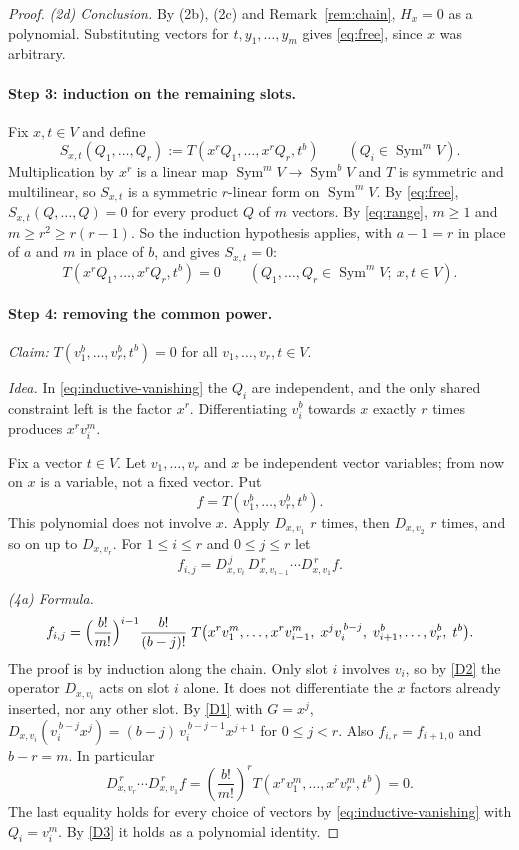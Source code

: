 \documentclass[11pt]{article}
\theoremstyle{remark}
\DeclareMathOperator{\Sym}{Sym}
\newcommand{\D}[2]{D_{#1,#2}}
\begin{document}
\begin{proof}
\emph{(2d) Conclusion.}
By (2b), (2c) and Remark~\ref{rem:chain}, $H_x=0$ as a polynomial.
Substituting vectors for $t,y_1,\ldots,y_m$ gives \eqref{eq:free}, since
$x$ was arbitrary.

\paragraph{Step 3: induction on the remaining slots.}
Fix $x,t\in V$ and define
\[
 S_{x,t}(Q_1,\ldots,Q_r)
 :=T(x^rQ_1,\ldots,x^rQ_r,t^b)
 \qquad(Q_i\in\Sym^mV).
\]
Multiplication by $x^r$ is a linear map $\Sym^mV\to\Sym^bV$ and $T$ is
symmetric and multilinear, so $S_{x,t}$ is a symmetric $r$-linear form on
$\Sym^mV$. By \eqref{eq:free}, $S_{x,t}(Q,\ldots,Q)=0$ for every product
$Q$ of $m$ vectors. By \eqref{eq:range}, $m\ge1$ and
$m\ge r^2\ge r(r-1)$. So the induction hypothesis applies, with $a-1=r$
in place of $a$ and $m$ in place of $b$, and gives $S_{x,t}=0$:
\begin{equation}\label{eq:inductive-vanishing}
 T(x^rQ_1,\ldots,x^rQ_r,t^b)=0
 \qquad(Q_1,\ldots,Q_r\in\Sym^m V;\ x,t\in V).
\end{equation}

\paragraph{Step 4: removing the common power.}
\emph{Claim:} $T(v_1^b,\ldots,v_r^b,t^b)=0$ for all
$v_1,\ldots,v_r,t\in V$.

\emph{Idea.} In \eqref{eq:inductive-vanishing} the $Q_i$ are independent,
and the only shared constraint left is the factor $x^r$. Differentiating
$v_i^b$ towards $x$ exactly $r$ times produces $x^rv_i^m$.

Fix a vector $t\in V$. Let $v_1,\ldots,v_r$ and $x$ be independent vector
variables; from now on $x$ is a variable, not a fixed vector. Put
\[
 f=T(v_1^b,\ldots,v_r^b,t^b).
\]
This polynomial does not involve $x$. Apply $\D{x}{v_1}$ $r$ times, then
$\D{x}{v_2}$ $r$ times, and so on up to $\D{x}{v_r}$. For $1\le i\le r$ and
$0\le j\le r$ let
\[
 f_{i,j}=\D{x}{v_i}^{\,j}\,\D{x}{v_{i-1}}^{\,r}\cdots\D{x}{v_1}^{\,r}f .
\]

\emph{(4a) Formula.}
\[
 f_{i,j}=\Bigl(\frac{b!}{m!}\Bigr)^{i-1}\frac{b!}{(b-j)!}\;
 T\bigl(x^rv_1^m,\ldots,x^rv_{i-1}^m,\;x^{j}v_i^{\,b-j},\;
 v_{i+1}^b,\ldots,v_r^b,\;t^b\bigr).
\]
The proof is by induction along the chain. Only slot $i$ involves $v_i$,
so by \ref{D2} the operator $\D{x}{v_i}$ acts on slot $i$ alone. It does
not differentiate the $x$ factors already inserted, nor any other slot. By
\ref{D1} with $G=x^{j}$,
$\D{x}{v_i}(v_i^{\,b-j}x^{j})=(b-j)\,v_i^{\,b-j-1}x^{j+1}$ for
$0\le j<r$. Also $f_{i,r}=f_{i+1,0}$ and $b-r=m$. In particular
\begin{equation}\label{eq:second-composition}
 \D{x}{v_r}^{\,r}\cdots\D{x}{v_1}^{\,r}f
 =\left(\frac{b!}{m!}\right)^r
 T(x^rv_1^m,\ldots,x^rv_r^m,t^b)=0.
\end{equation}
The last equality holds for every choice of vectors by
\eqref{eq:inductive-vanishing} with $Q_i=v_i^m$. By \ref{D3} it holds as a
polynomial identity.


\end{proof}
\end{document}
